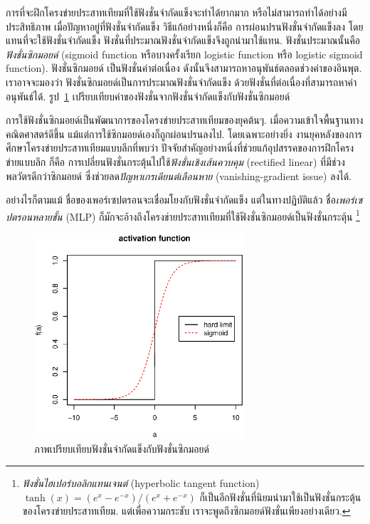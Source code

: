 การที่จะฝึกโครงข่ายประสาทเทียมที่ใช้ฟังชั่นจำกัดแข็งจะทำได้ยากมาก หรือไม่สามารถทำได้อย่างมีประสิทธิภาพ
%
เมื่อปัญหาอยู่ที่ฟังชั่นจำกัดแข็ง วิธีแก้อย่างหนึ่งก็คือ การผ่อนปรนฟังชั่นจำกัดแข็งลง
โดย แทนที่จะใช้ฟังชั่นจำกัดแข็ง ฟังชั่นที่ประมาณฟังชั่นจำกัดแข็งจึงถูกนำมาใช้แทน.
ฟังชั่นประมาณนั้นคือ \textit{ฟังชั่นซิกมอยด์} (sigmoid function หรือบางครั้งเรียก logistic function หรือ logistic sigmoid function).
ฟังชั่นซิกมอยด์ เป็นฟังชั่นค่าต่อเนื่อง ดังนั้นจึงสามารถหาอนุพันธ์ตลอดช่วงค่าของอินพุต.
เราอาจจะมองว่า ฟังชั่นซิกมอยด์เป็นการประมาณฟังชั่นจำกัดแข็ง ด้วยฟังชั่นที่ต่อเนื่องที่สามารถหาค่าอนุพันธ์ได้.
รูป~\ref{fig: ANN activation function} เปรียบเทียบค่าของฟังชั่นจากฟังชั่นจำกัดแข็งกับฟังชั่นซิกมอยด์

{\small
\begin{shaded}
การใช้ฟังชั่นซิกมอยด์เป็นพัฒนาการของโครงข่ายประสาทเทียมของยุคต้นๆ.
เมื่อความเข้าใจพื้นฐานทางคณิตศาสตร์ดีขึ้น แม้แต่การใช้ซิกมอยด์เองก็ถูกผ่อนปรนลงไป.
โดยเฉพาะอย่างยิ่ง 
งานยุคหลังของการศึกษาโครงข่ายประสาทเทียมแบบลึกที่พบว่า
ปัจจัยสำคัญอย่างหนึ่งที่ช่วยแก้อุปสรรคของการฝึกโครงข่ายแบบลึก 
ก็คือ การเปลี่ยนฟังชั่นกระตุ้นไปใช้\textit{ฟังชั่นเชิงเส้นควบคุม} (rectified linear) 
ที่มีช่วงพลวัตรดีกว่าซิกมอยด์ ซึ่งช่วยลด\textit{ปัญหาเกรเดียนต์เลือนหาย} (vanishing-gradient issue) ลงได้.
\end{shaded}
}

อย่างไรก็ตามแม้ ชื่อของเพอร์เซปตรอนจะเชื่อมโยงกับฟังชั่นจำกัดแข็ง 
แต่ในทางปฏิบัติแล้ว ชื่อ\textit{เพอร์เซปตรอนหลายชั้น} (MLP) ก็มักจะอ้างถึงโครงข่ายประสาทเทียมที่ใช้ฟังชั่นซิกมอยด์เป็นฟังชั่นกระตุ้น%
\footnote{
\textit{ฟังชั่นไฮเปอร์บอลิกแทนเจนต์} (hyperbolic tangent function)
$\tanh(x) = (e^x - e^{-x})/(e^x + e^{-x})$ 
ก็เป็นอีกฟังชั่นที่นิยมนำมาใช้เป็นฟังชั่นกระตุ้นของโครงข่ายประสาทเทียม.
แต่เพื่อความกระชับ เราจะพูดถึงซิกมอยด์ฟังชั่นเพียงอย่างเดียว.
}

%
\begin{figure}
\begin{center}
\includegraphics[height=3in]{04ANN/activation.eps}
\end{center}
\caption{ภาพเปรียบเทียบฟังชั่นจำกัดแข็งกับฟังชั่นซิกมอยด์}
\label{fig: ANN activation function}
\end{figure}
%

